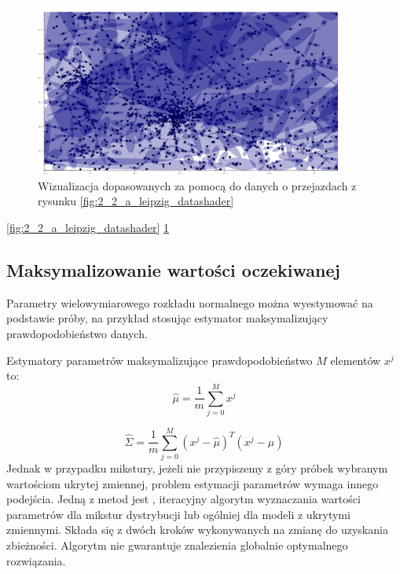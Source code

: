 \begin{figure}[H]
    \centering
    \includegraphics[width=0.9\textwidth]{images/2_2_a_leipzig_gmm}
    \caption{Wizualizacja  dopasowanych za pomocą  do danych o przejazdach z rysunku \ref{fig:2_2_a_leipzig_datashader}}
    \label{fig:2_2_a_leipzig_gmm}
\end{figure}

\ref{fig:2_2_a_leipzig_datashader}
\ref{fig:2_2_a_leipzig_gmm}

\subsection{Maksymalizowanie wartości oczekiwanej}\label{sec:expectation_maximization}

Parametry wielowymiarowego rozkładu normalnego można wyestymować na podstawie próby, na przykład
stosując estymator maksymalizujący prawdopodobieństwo danych.

Estymatory parametrów maksymalizujące prawdopodobieństwo $M$ elementów $x^j$ to:
$$\hat{\mu} = \frac{1}{m} \sum_{j=0}^M x^{j}$$

$$\hat{\Sigma} = \frac{1}{m} \sum_{j=0}^M (x^{j} - \hat{\mu})^T (x^{j} - \hat{\mu})$$
Jednak w przypadku mikstury, jeżeli nie przypiszemy z góry próbek wybranym wartościom ukrytej zmiennej, problem
estymacji parametrów wymaga innego podejścia. Jedną z metod jest , iteracyjny
algorytm wyznaczania wartości parametrów dla mikstur dystrybucji lub ogólniej dla modeli z ukrytymi zmiennymi.
Składa się z dwóch kroków wykonywanych na zmianę do uzyskania zbieżności.  Algorytm nie gwarantuje znalezienia
globalnie optymalnego rozwiązania.

